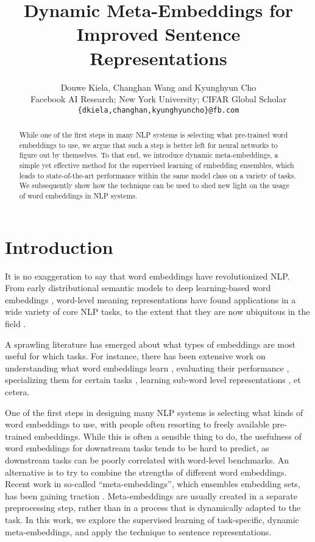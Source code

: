 \documentclass[11pt,a4paper]{article}
\title{Dynamic Meta-Embeddings for Improved Sentence Representations}
\author{Douwe Kiela, Changhan Wang and Kyunghyun Cho \\
   Facebook AI Research;  New York University;  CIFAR Global Scholar
  \\
  {\tt \{dkiela,changhan,kyunghyuncho\}@fb.com}\\}
\date{}
\begin{document}
\maketitle
\begin{abstract}
While one of the first steps in many NLP systems is selecting what pre-trained word embeddings to use, we argue that such a step is better left for neural networks to figure out by themselves. To that end, we introduce dynamic meta-embeddings, a simple yet effective method for the supervised learning of embedding ensembles, which leads to state-of-the-art performance within the same model class on a variety of tasks. We subsequently show how the technique can be used to shed new light on the usage of word embeddings in NLP systems.
\end{abstract}

\section{Introduction}
It is no exaggeration to say that word embeddings have revolutionized NLP. From early distributional semantic models \cite{Turney:2010jair,Erk:2012llc,Clark:2015book} to deep learning-based word embeddings \cite{Bengio:2003jmlr,Collobert:2008icml,Mikolov:2013nips,Pennington:2014emnlp,Bojanowski:2016arxiv}, word-level meaning representations have found applications in a wide variety of core NLP tasks, to the extent that they are now ubiquitous in the field \cite{Goldberg:2016jair}.

A sprawling literature has emerged about what types of embeddings are most useful for which tasks. For instance, there has been extensive work on understanding what word embeddings learn \cite{Levy:2014nips}, evaluating their performance \cite{Milajevs:2014arxiv,Schnabel:2015emnlp,Bakarov:2017arxiv}, specializing them for certain tasks \cite{Maas:2011acl,Faruqui:2014arxiv,Kiela:2015emnlp,Mrksic:2016acl,Vulic:2017arxiv}, learning sub-word level representations \cite{Wieting:2016arxiv,Bojanowski:2016arxiv,Lee:2016arxiv}, et cetera.

One of the first steps in designing many NLP systems is selecting what kinds of word embeddings to use, with people often resorting to freely available pre-trained embeddings. While this is often a sensible thing to do, the usefulness of word embeddings for downstream tasks tends to be hard to predict, as downstream tasks can be poorly correlated with word-level benchmarks. An alternative is to try to combine the strengths of different word embeddings.  Recent work in so-called ``meta-embeddings'', which ensembles embedding sets, has been gaining traction \cite{Yin:2015arxiv,Bollegala:2017arxiv,Muromagi:2017nodalida,Coates:2018naacl}. Meta-embeddings are usually created in a separate preprocessing step, rather than in a process that is dynamically adapted to the task. In this work, we explore the supervised learning of task-specific, dynamic meta-embeddings, and
apply the technique to sentence representations.
\end{document}
